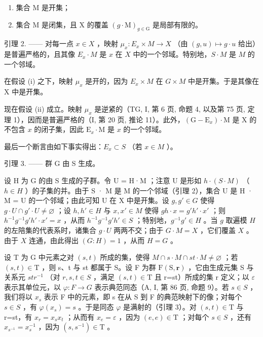 \begin{enumerate}
\def\labelenumi{(\roman{enumi})}
\item
  集合 M 是开集；
\item
  集合 M 是闭集，且 X 的覆盖 \((g \cdot \mathrm{M})_{g \in \mathrm{G}}\) 是局部有限的。
\end{enumerate}

引理 2. —— 对每一点 \(x \in X\) ，映射 \(\mu_x: E_x \times M \to X\) （由 \((g, u) \mapsto g \cdot u\) 给出）是普遍严格的，且其像 \(E_x \cdot M\) 是 \(x\) 在 \(X\) 中的一个邻域。特别地，\(S \cdot M\) 是 \(M\) 的一个邻域。

在假设 (i) 之下，映射 \(\mu_{x}\) 是开的，因为 \(E_{x} \times M\) 在 \(G \times M\) 中是开集。于是其像在 X 中是开集。

现在假设 (ii) 成立。映射 \(\mu_x\) 是逆紧的（TG, I, 第 6 页, 命题 4, 以及第 75 页, 定理 1），因而是普遍严格的（I, 第 20 页, 推论 11）。此外，\((\mathrm{G} - \mathrm{E}_x) \cdot \mathrm{M}\) 是 X 的不包含 \(x\) 的闭子集，因此 \(\mathrm{E}_x \cdot \mathrm{M}\) 是 \(x\) 的一个邻域。

最后一个断言由如下事实得出：\(E_{x} \subset S\) （若 \(x \in M\) ）。

引理 3. —— 群 G 由 S 生成。

设 H 为 G 的由 S 生成的子群。令 U = H·M ；注意 U 是形如 \(h \cdot (S \cdot M)\) （\(h \in H\) ）的子集的并。由于 S · M 是 M 的一个邻域（引理 2），集合 U 是 H · M = U 的一个邻域；由此可知 U 在 X 中是开集。设 \(g, g' \in G\) 使得 \(g \cdot U \cap g' \cdot U \neq \varnothing\) ；设 \(h, h' \in H\) 与 \(x, x' \in M\) 使得 \(gh \cdot x = g'h' \cdot x'\) ；则 \(h^{-1}g^{-1}g'h' \cdot x' = x\) ，从而 \(h^{-1}g^{-1}g'h' \in S\) ；特别地，\(g^{-1}g' \in H\) 。当 \(g\) 取遍模 \(H\) 的左陪集的代表系时，诸集合 \(g \cdot U\) 两两不交；由于 \(G \cdot M = X\) ，它们覆盖 \(X\) 。由于 \(X\) 连通，由此得出 \((G : H) = 1\) ，从而 \(H = G\) 。

设 T 为 G 中元素之对 \((s,t)\) 所成的集，使得 \(M\cap s\cdot M\cap st\cdot M\neq\varnothing\) ；若 \((s,t)\in\mathrm{T}\) ，则 s、t 与 st 都属于 S。设 F 为群 \(\mathrm{F}(\mathrm{S},\mathbf{r})\) ，它由生成元集 S 与关系元 \(str^{-1}\) （对 \(r,s,t\in S\) ，满足 \((s,t)\in\mathrm{T}\) 且 r=st）所成的集 r 定义；以 \(\varepsilon\) 表示其单位元，以 \(\varphi\colon F\to G\) 表示典范同态（A, I, 第 86 页, 命题 9）。若 \(s\in S\) ，我们将以 \(x_{s}\) 表示 F 中的元素，即 s 在从 S 到 F 的典范映射下的像；对每个 \(s\in S\) ，有 \(\varphi(x_{s})=s\) 。于是同态 \(\varphi\) 是满射的（引理 3）。对 \((s,t)\in\mathrm{T}\) 与 r=st，有 \(x_{r}=x_{s}x_{t}\) ；从而有 \(x_{e}=\varepsilon\) ，因为 \((e,e)\in\mathrm{T}\) ；对每个 \(s\in S\) ，还有 \(x_{s^{-1}}=x_{s}^{-1}\) ，因为 \((s,s^{-1})\in\mathrm{T}\) 。

